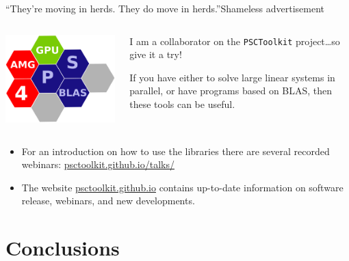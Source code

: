 \documentclass[xcolor={svgnames,usenames}]{beamer}
\begin{document}
\begin{frame}{``They're moving in herds. They do move in herds.''}{Shameless advertisement}

\begin{columns}
\begin{column}{0.3\textwidth}
\centering
\includegraphics[width=0.8\columnwidth]{psctoolkit.png}
\end{column}
\begin{column}{0.7\textwidth}
I am a collaborator on the \texttt{PSCToolkit} project\ldots so give it a try! 

\vfill
If you have either to solve large linear systems in parallel,
or have programs based on BLAS, then these tools can be useful.
\end{column}
\end{columns}

\begin{itemize}
	\item For an introduction on  how to use the libraries there are several recorded webinars: \href{https://psctoolkit.github.io/talks/}{psctoolkit.github.io/talks/}
	\item The website \href{https://psctoolkit.github.io/}{psctoolkit.github.io} contains up-to-date information on software release, webinars, and new developments.
\end{itemize}

\end{frame}

\section{Conclusions}
\end{document}

